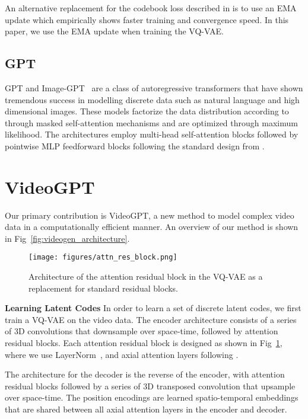 \documentclass{article}
\begin{document}
An alternative replacement for the codebook loss described in \cite{van2017neural} is to use an EMA update which empirically shows faster training and convergence speed. In this paper, we use the EMA update when training the VQ-VAE. 

\subsection{GPT}

GPT and Image-GPT~\citep{chen2020generative} are a class of autoregressive transformers that have shown tremendous success in modelling discrete data such as natural language and high dimensional images. These models factorize the data distribution  according to  through masked self-attention mechanisms and are optimized through maximum likelihood. The architectures employ multi-head self-attention blocks followed by pointwise MLP feedforward blocks following the standard design from \cite{vaswani2017attention}.


 

\section{VideoGPT}
Our primary contribution is VideoGPT, a new method to model complex video data in a computationally efficient manner. An overview of our method is shown in Fig~\ref{fig:videogen_architecture}.

\begin{figure}[h]
    \centering
    \texttt{[image: figures/attn\_res\_block.png]}
    \caption{Architecture of the attention residual block in the VQ-VAE as a replacement for standard residual blocks.}
    \label{fig:attn_res_block}
\end{figure}

\textbf{Learning Latent Codes}
In order to learn a set of discrete latent codes, we first train a VQ-VAE on the video data. The encoder architecture consists of a series of 3D convolutions that downsample over space-time, followed by attention residual blocks. Each attention residual block is designed as shown in Fig~\ref{fig:attn_res_block}, where we use LayerNorm~\citep{ba2016layer}, and axial attention layers following \cite{ho2019axial}.


The architecture for the decoder is the reverse of the encoder, with attention residual blocks followed by a series of 3D transposed convolution that upsample over space-time. The position encodings are learned spatio-temporal embeddings that are shared between all axial attention layers in the encoder and decoder.
\end{document}
